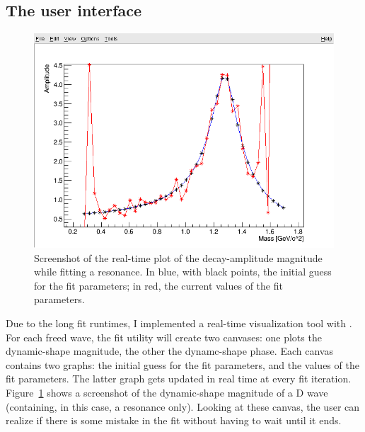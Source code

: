     
    
    

    \subsection{The user interface}
    \begin{figure}
        \centering
        \includegraphics[width=.9\textwidth]{fig/f2_real_time_fit.png}

        \caption[Screenshot of the real-time plot of a decay-amplitude magnitude.]{Screenshot of the real-time plot of the decay-amplitude magnitude while fitting a \Pfii{} resonance.
                 In blue, with black points, the initial guess for the fit parameters; in red, the current values of the fit parameters.}
        \label{fig:rt_par_fit}
    \end{figure}


    Due to the long fit runtimes, I implemented a real-time visualization tool with \ROOT{}.
    For each freed wave, the fit utility will create two canvases: one plots the dynamic-shape magnitude, the other the dynamc-shape phase.
    Each canvas contains two \ROOT{} graphs: the initial guess for the fit parameters, and the values of the fit parameters.
    The latter graph gets updated in real time at every fit iteration.
    Figure~\ref{fig:rt_par_fit} shows a screenshot of the dynamic-shape magnitude of a D wave (containing, in this case, a \Pfii{} resonance only).
    Looking at these canvas, the user can realize if there is some mistake in the fit without having to wait until it ends.

